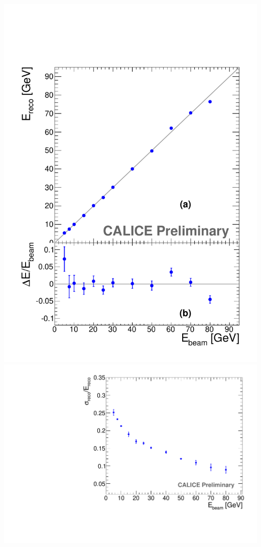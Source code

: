 \documentclass[8pt]{beamer}
\begin{document}
\begin{frame}
\begin{minipage}{0.65\linewidth}
    \end{minipage} \hfill
    \begin{minipage}{0.3\linewidth}

      \pause
      \begin{center}
        \includegraphics[width=\linewidth]{figs/Energy-Linearity.pdf} \\
        \includegraphics[width=\linewidth]{figs/Energy-Resolution.pdf}

\end{center}
\end{minipage}
\end{frame}
\end{document}
